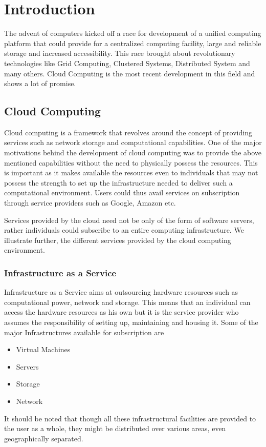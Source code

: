 
\chapter{Introduction}
The advent of computers kicked off a race for development of a unified computing platform that could provide for a centralized computing facility, large and reliable storage and increased accessibility. This race brought about revolutionary technologies like Grid Computing, Clustered Systems, Distributed System and many others. Cloud Computing is the most recent development in this field and shows a lot of promise.
\section{Cloud Computing}
Cloud computing is a framework that revolves around the concept of providing services such as network storage and computational capabilities. One of the major motivations behind the development of cloud computing was to provide the above mentioned capabilities without the need to physically possess the resources. This is important as it makes available the resources even to individuals that may not possess the strength to set up the infrastructure needed to deliver such a computational environment. Users could thus avail services on subscription through service providers such as Google, Amazon etc.

Services provided by the cloud need not be only of the form of software servers, rather individuals could subscribe to an entire computing infrastructure. We illustrate further, the different services provided by the cloud computing environment.
\subsection{Infrastructure as a Service}
Infrastructure as a Service aims at outsourcing hardware resources such as computational power, network and storage. This means that an individual can access the hardware resources as his own but it is the service provider who assumes the responsibility of setting up, maintaining and housing it. Some of the major Infrastructures available for subscription are
	\begin{itemize}
		\item Virtual Machines
		\item Servers
		\item Storage
		\item Network
	\end{itemize}
It should be noted that though all these infrastructural facilities are provided to the user as a whole, they might be distributed over various areas, even geographically separated.
